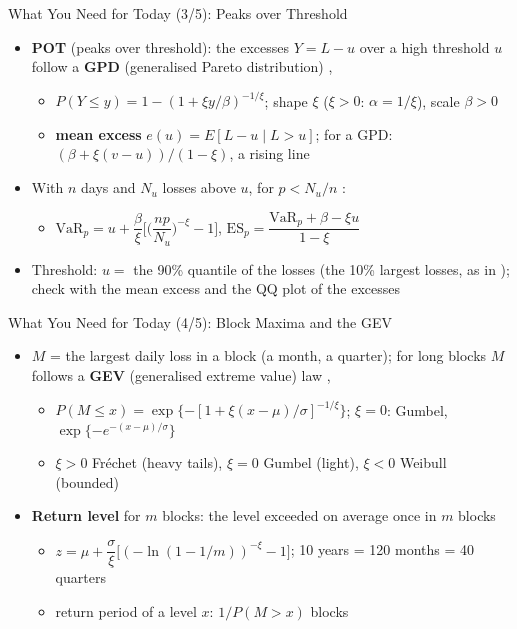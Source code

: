 \begin{frame}{What You Need for Today (3/5): Peaks over Threshold}
\itemsize{\small}
\begin{itemize}
    \item \textbf{POT} (peaks over threshold): the excesses $Y = L - u$ over a high threshold $u$ follow a \textbf{GPD} (generalised Pareto distribution) , 
    \begin{itemize}
        \item $P(Y \le y) = 1 - (1 + \xi y/\beta)^{-1/\xi}$; shape $\xi$ ($\xi > 0$: $\alpha = 1/\xi$), scale $\beta > 0$
        \item \textbf{mean excess} $e(u) = E[L - u \mid L > u]$; for a GPD: $(\beta + \xi(v - u))/(1 - \xi)$, a rising line
    \end{itemize}
    \item With $n$ days and $N_u$ losses above $u$, for $p < N_u/n$ :
    \begin{itemize}
        \item $\mathrm{VaR}_p = u + \dfrac{\beta}{\xi}\Big[\Big(\dfrac{np}{N_u}\Big)^{-\xi} - 1\Big]$, \quad $\mathrm{ES}_p = \dfrac{\mathrm{VaR}_p + \beta - \xi u}{1 - \xi}$
    \end{itemize}
    \item Threshold: $u =$ the 90\% quantile of the losses (the 10\% largest losses, as in ); check with the mean excess and the QQ plot of the excesses
\end{itemize}
\end{frame}

\begin{frame}{What You Need for Today (4/5): Block Maxima and the GEV}
\itemsize{\small}
\begin{itemize}
    \item $M$ = the largest daily loss in a block (a month, a quarter); for long blocks $M$ follows a \textbf{GEV} (generalised extreme value) law , 
    \begin{itemize}
        \item $P(M \le x) = \exp\{-[1 + \xi(x - \mu)/\sigma]^{-1/\xi}\}$; $\xi = 0$: Gumbel, $\exp\{-e^{-(x - \mu)/\sigma}\}$
        \item $\xi > 0$ Fréchet (heavy tails), $\xi = 0$ Gumbel (light), $\xi < 0$ Weibull (bounded)
    \end{itemize}
    \item \textbf{Return level} for $m$ blocks: the level exceeded on average once in $m$ blocks
    \begin{itemize}
        \item $z = \mu + \dfrac{\sigma}{\xi}\big[(-\ln(1 - 1/m))^{-\xi} - 1\big]$; 10 years = 120 months = 40 quarters
        \item return period of a level $x$: $1/P(M > x)$ blocks
    \end{itemize}
\end{itemize}
\end{frame}

